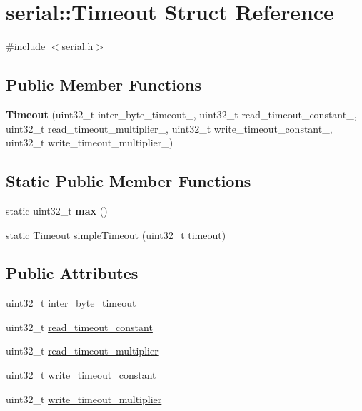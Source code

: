 \hypertarget{structserial_1_1_timeout}{}\section{serial\+:\+:Timeout Struct Reference}
\label{structserial_1_1_timeout}


{\ttfamily \#include $<$serial.\+h$>$}

\subsection*{Public Member Functions}
\begin{DoxyCompactItemize}
\item 
{\bfseries Timeout} (uint32\+\_\+t inter\+\_\+byte\+\_\+timeout\+\_, uint32\+\_\+t read\+\_\+timeout\+\_\+constant\+\_, uint32\+\_\+t read\+\_\+timeout\+\_\+multiplier\+\_, uint32\+\_\+t write\+\_\+timeout\+\_\+constant\+\_, uint32\+\_\+t write\+\_\+timeout\+\_\+multiplier\+\_)\hypertarget{structserial_1_1_timeout_a1a454b17f5d653b8e1b04b3ec2fead59}{}\label{structserial_1_1_timeout_a1a454b17f5d653b8e1b04b3ec2fead59}

\end{DoxyCompactItemize}
\subsection*{Static Public Member Functions}
\begin{DoxyCompactItemize}
\item 
static uint32\+\_\+t {\bfseries max} ()\hypertarget{structserial_1_1_timeout_adc68e33d2f94bfa33ba1062c363b9151}{}\label{structserial_1_1_timeout_adc68e33d2f94bfa33ba1062c363b9151}

\item 
static \hyperlink{structserial_1_1_timeout}{Timeout} \hyperlink{structserial_1_1_timeout_aa4fbd72e16f47c9aea9fb3c32ca17828}{simple\+Timeout} (uint32\+\_\+t timeout)
\end{DoxyCompactItemize}
\subsection*{Public Attributes}
\begin{DoxyCompactItemize}
\item 
uint32\+\_\+t \hyperlink{structserial_1_1_timeout_ada15f2a0ae478cbb62ef79d1633b2b81}{inter\+\_\+byte\+\_\+timeout}
\item 
uint32\+\_\+t \hyperlink{structserial_1_1_timeout_a099244649dec66b6e0548480edeb2b9f}{read\+\_\+timeout\+\_\+constant}
\item 
uint32\+\_\+t \hyperlink{structserial_1_1_timeout_a64412753eb2edf1621716dd9f1a4e71e}{read\+\_\+timeout\+\_\+multiplier}
\item 
uint32\+\_\+t \hyperlink{structserial_1_1_timeout_accf01b97f83564f4ce3d6e5f63e21006}{write\+\_\+timeout\+\_\+constant}
\item 
uint32\+\_\+t \hyperlink{structserial_1_1_timeout_a31ddae32907cff9c3d27fa763981317d}{write\+\_\+timeout\+\_\+multiplier}
\end{DoxyCompactItemize}


